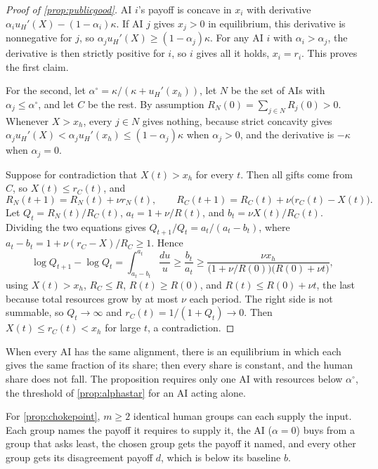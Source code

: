 \documentclass[article, 11pt, reqno]{amsart}
\theoremstyle{named}
\theoremstyle{plain}
\begin{document}
\begin{proof}[Proof of \cref{prop:publicgood}]
AI $i$'s payoff is concave in $x_i$ with derivative $\alpha_i u_H'(X) - (1-\alpha_i)\kappa$. If AI $j$ gives $x_j > 0$ in equilibrium, this derivative is nonnegative for $j$, so $\alpha_j u_H'(X) \ge (1-\alpha_j)\kappa$. For any AI $i$ with $\alpha_i > \alpha_j$, the derivative is then strictly positive for $i$, so $i$ gives all it holds, $x_i = r_i$. This proves the first claim.

For the second, let $\alpha^\circ = \kappa/(\kappa + u_H'(x_h))$, let $N$ be the set of AIs with $\alpha_j \le \alpha^\circ$, and let $C$ be the rest. By assumption $R_N(0) = \sum_{j \in N} R_j(0) > 0$. Whenever $X > x_h$, every $j \in N$ gives nothing, because strict concavity gives $\alpha_j u_H'(X) < \alpha_j u_H'(x_h) \le (1-\alpha_j)\kappa$ when $\alpha_j > 0$, and the derivative is $-\kappa$ when $\alpha_j = 0$.

Suppose for contradiction that $X(t) > x_h$ for every $t$. Then all gifts come from $C$, so $X(t) \le r_C(t)$, and
\[
R_N(t+1) = R_N(t) + \nu r_N(t), \qquad R_C(t+1) = R_C(t) + \nu\big(r_C(t) - X(t)\big).
\]
Let $Q_t = R_N(t)/R_C(t)$, $a_t = 1 + \nu/R(t)$, and $b_t = \nu X(t)/R_C(t)$. Dividing the two equations gives $Q_{t+1}/Q_t = a_t/(a_t - b_t)$, where $a_t - b_t = 1 + \nu(r_C - X)/R_C \ge 1$. Hence
\[
\log Q_{t+1} - \log Q_t = \int_{a_t - b_t}^{a_t} \frac{du}{u} \ge \frac{b_t}{a_t} \ge \frac{\nu x_h}{\big(1 + \nu/R(0)\big)\big(R(0) + \nu t\big)},
\]
using $X(t) > x_h$, $R_C \le R$, $R(t) \ge R(0)$, and $R(t) \le R(0) + \nu t$, the last because total resources grow by at most $\nu$ each period. The right side is not summable, so $Q_t \to \infty$ and $r_C(t) = 1/(1 + Q_t) \to 0$. Then $X(t) \le r_C(t) < x_h$ for large $t$, a contradiction.
\end{proof}

When every AI has the same alignment, there is an equilibrium in which each gives the same fraction of its share; then every share is constant, and the human share does not fall. The proposition requires only one AI with resources below $\alpha^\circ$, the threshold of \cref{prop:alphastar} for an AI acting alone.

For \cref{prop:chokepoint}, $m \ge 2$ identical human groups can each supply the input. Each group names the payoff it requires to supply it, the AI ($\alpha = 0$) buys from a group that asks least, the chosen group gets the payoff it named, and every other group gets its disagreement payoff $d$, which is below its baseline $b$.
\end{document}
